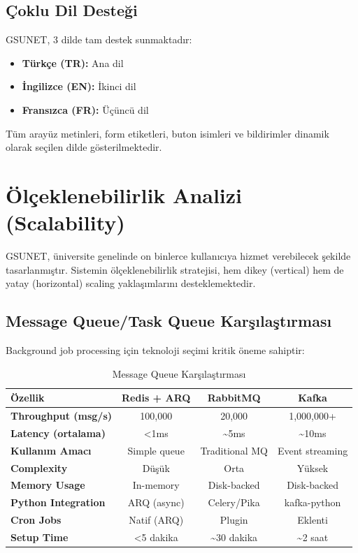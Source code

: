 \documentclass[a4paper,12pt]{report}
\begin{document}
\subsection{Çoklu Dil Desteği}

GSUNET, 3 dilde tam destek sunmaktadır:
\begin{itemize}
    \item \textbf{Türkçe (TR):} Ana dil
    \item \textbf{İngilizce (EN):} İkinci dil
    \item \textbf{Fransızca (FR):} Üçüncü dil
\end{itemize}

Tüm arayüz metinleri, form etiketleri, buton isimleri ve bildirimler dinamik olarak seçilen dilde gösterilmektedir.

\section{Ölçeklenebilirlik Analizi (Scalability)}

GSUNET, üniversite genelinde on binlerce kullanıcıya hizmet verebilecek şekilde tasarlanmıştır. Sistemin ölçeklenebilirlik stratejisi, hem dikey (vertical) hem de yatay (horizontal) scaling yaklaşımlarını desteklemektedir.

\subsection{Message Queue/Task Queue Karşılaştırması}

Background job processing için teknoloji seçimi kritik öneme sahiptir:

\begin{table}[h]
\centering
\small
\begin{tabular}{|l|c|c|c|}
\hline
\textbf{Özellik} & \textbf{Redis + ARQ} & \textbf{RabbitMQ} & \textbf{Kafka} \\ \hline
\textbf{Throughput (msg/s)} & 100,000 & 20,000 & 1,000,000+ \\ \hline
\textbf{Latency (ortalama)} & <1ms & \textasciitilde{}5ms & \textasciitilde{}10ms \\ \hline
\textbf{Kullanım Amacı} & Simple queue & Traditional MQ & Event streaming \\ \hline
\textbf{Complexity} & Düşük & Orta & Yüksek \\ \hline
\textbf{Memory Usage} & In-memory & Disk-backed & Disk-backed \\ \hline
\textbf{Python Integration} & ARQ (async) & Celery/Pika & kafka-python \\ \hline
\textbf{Cron Jobs} & Natif (ARQ) & Plugin & Eklenti \\ \hline
\textbf{Setup Time} & <5 dakika & \textasciitilde{}30 dakika & \textasciitilde{}2 saat \\ \hline
\end{tabular}
\caption{Message Queue Karşılaştırması}
\end{table}
\end{document}
